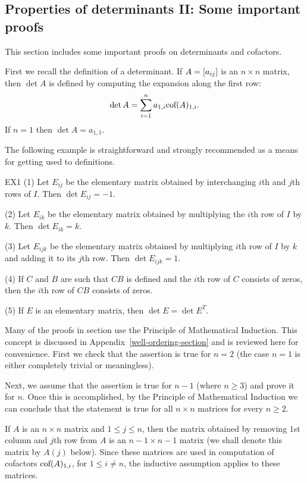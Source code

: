 \subsection{Properties of determinants II: Some important proofs } \label{sec:determinant-proofs}

This section includes some important proofs on determinants and cofactors.

First we recall the definition of a determinant. If $A=\left[a_{ij} \right]$ is an $n\times n$ matrix, then $\det A$ is defined by computing the expansion along the first row:
\begin{equation}
\label{E1} 
\det A=\sum_{i=1}^n a_{1,i} \mbox{\rm cof}(A)_{1,i}. 
\end{equation}
If $n=1$ then $\det A=a_{1,1}$. 

The following example is straightforward and strongly recommended as a means for
getting used to definitions. 

\begin{example}{}{EX1}
(1) Let $E_{ij}$ be the elementary matrix obtained by interchanging $i$th and $j$th rows of $I$. 
Then $\det E_{ij}=-1$. 

(2) Let $E_{ik}$ be the elementary matrix obtained by multiplying the $i$th row of $I$ by $k$. 
Then $\det E_{ik}=k$. 

(3) Let $E_{ijk}$ be the elementary matrix obtained by multiplying $i$th row of $I$ by $k$ and 
adding it to its $j$th row. Then $\det E_{ijk}=1$. 

(4) If $C$ and $B$ are such that $CB$ is defined and the $i$th row of $C$ consists of zeros, 
then the $i$th row of $CB$ consists of zeros. 

(5) If $E$ is an elementary matrix, then $\det E=\det E^T$. 
\end{example} 

Many of the proofs in section use the Principle of Mathematical Induction. This concept is discussed in Appendix~\ref{well-ordering-section} and is reviewed here for convenience.
First we check that the assertion is true for $n=2$ (the case $n=1$ is either completely trivial
or meaningless). 

Next, we assume that the assertion is true for $n-1$ (where $n\geq 3$) and prove it for $n$. 
Once this is accomplished, by the Principle of Mathematical Induction we can conclude that the 
statement is true for all $n\times n$ matrices for every $n\geq 2$. 

If $A$ is an $n\times n$ matrix and $1\leq j \leq n$,
then the matrix obtained by removing $1$st column and $j$th row from $A$ 
is an $n-1\times n-1$ matrix (we shall denote this matrix by $A(j)$ below). Since these matrices 
are used in computation of cofactors $\mbox{\rm cof}(A)_{1,i}$, for $1\leq i\neq n$, 
the inductive assumption applies to these matrices. 

